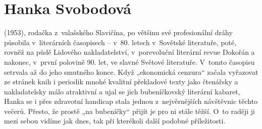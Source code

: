 \section{Hanka Svobodová}

\noindent
(1953), rodačka z valašského Slavičína, po většinu své profesionální dráhy působila v literárních časopisech – v 80. letech v Sovětské literatuře, poté, rovněž na půdě Lidového nakladatelství, v porevoluční literární revue Dokořán a nakonec, v první polovině 90. let, ve slavné Světové literatuře. V tomto časopisu setrvala až do jeho smutného konce. Když „ekonomická cenzura“ začala vyřazovat ze stránek knih i periodik mnohé kvalitní překladové texty jako čtenářsky a nakladatelsky málo atraktivní a ujal se jich bubeníčkovský literární kabaret, Hanka se i přes zdravotní handicap stala jednou z~nejvěrnějších návštěvnic těchto večerů. Přesto, že prostě „na bubeníčky“ přijít je pro ni stále těžší. O~to raději ji mezi sebou vidíme jak dnes, tak při kterékoli další podobné příležitosti.



